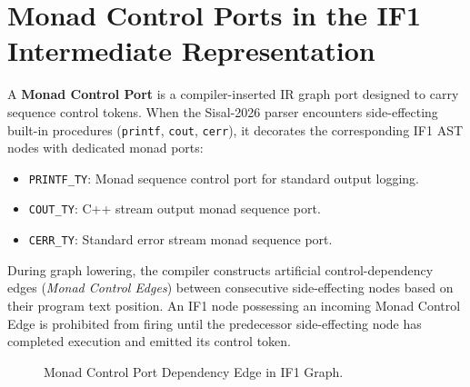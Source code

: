 \section{Monad Control Ports in the IF1 Intermediate Representation}
A \textbf{Monad Control Port} is a compiler-inserted IR graph port designed to carry sequence control tokens. When the Sisal-2026 parser encounters side-effecting built-in procedures (\texttt{printf}, \texttt{cout}, \texttt{cerr}), it decorates the corresponding IF1 AST nodes with dedicated monad ports:
\begin{itemize}
    \item \texttt{PRINTF\_TY}: Monad sequence control port for standard output logging.
    \item \texttt{COUT\_TY}: C++ stream output monad sequence port.
    \item \texttt{CERR\_TY}: Standard error stream monad sequence port.
\end{itemize}

During graph lowering, the compiler constructs artificial control-dependency edges (\emph{Monad Control Edges}) between consecutive side-effecting nodes based on their program text position. An IF1 node possessing an incoming Monad Control Edge is prohibited from firing until the predecessor side-effecting node has completed execution and emitted its control token.

\begin{figure}[h!]
\centering
{}
\caption{Monad Control Port Dependency Edge in IF1 Graph.}
\label{fig:monad_port}
\end{figure}


